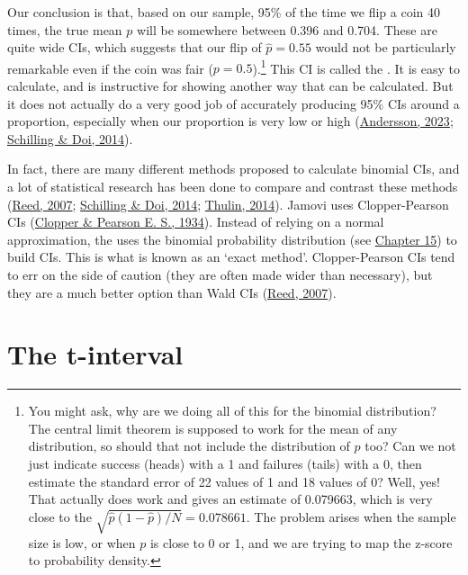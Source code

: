 \documentclass[
  openany]{krantz}
\begin{document}
Our conclusion is that, based on our sample, 95\% of the time we flip a coin 40 times, the true mean \(p\) will be somewhere between 0.396 and 0.704.
These are quite wide CIs, which suggests that our flip of \(\hat{p} = 0.55\) would not be particularly remarkable even if the coin was fair (\(p = 0.5\)).\footnote{You might ask, why are we doing all of this for the binomial distribution? The central limit theorem is supposed to work for the mean of any distribution, so should that not include the distribution of \(p\) too? Can we not just indicate success (heads) with a 1 and failures (tails) with a 0, then estimate the standard error of 22 values of 1 and 18 values of 0? Well, yes! That actually does work and gives an estimate of 0.079663, which is very close to the \(\sqrt{\hat{p}(1-\hat{p})/N} = 0.078661\). The problem arises when the sample size is low, or when \(p\) is close to 0 or 1, and we are trying to map the z-score to probability density.}
This CI is called the .
It is easy to calculate, and is instructive for showing another way that  can be calculated.
But it does not actually do a very good job of accurately producing 95\% CIs around a proportion, especially when our proportion is very low or high (\protect\hyperlink{ref-Andersson2023}{Andersson, 2023}; \protect\hyperlink{ref-Schilling2014}{Schilling \& Doi, 2014}).

In fact, there are many different methods proposed to calculate binomial CIs, and a lot of statistical research has been done to compare and contrast these methods (\protect\hyperlink{ref-Reed2007}{Reed, 2007}; \protect\hyperlink{ref-Schilling2014}{Schilling \& Doi, 2014}; \protect\hyperlink{ref-Thulin2014}{Thulin, 2014}).
Jamovi uses Clopper-Pearson CIs (\protect\hyperlink{ref-Clopper1934}{Clopper \& Pearson E. S., 1934}).
Instead of relying on a normal approximation, the  uses the binomial probability distribution (see \protect\hyperlink{Chapter_15}{Chapter 15}) to build CIs.
This is what is known as an `exact method'.
Clopper-Pearson CIs tend to err on the side of caution (they are often made wider than necessary), but they are a much better option than Wald CIs (\protect\hyperlink{ref-Reed2007}{Reed, 2007}).

\hypertarget{Chapter_19}{%
\chapter{The t-interval}\label{Chapter_19}}
\end{document}
